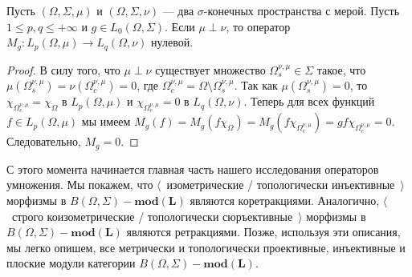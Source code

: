 \begin{proposition}\label{MultOpCharacBtwnTwoSingMeasSp} Пусть
$(\Omega,\Sigma,\mu)$ и $(\Omega,\Sigma,\nu)$ --- два $\sigma$-конечных
пространства с мерой. Пусть $1\leq p,q\leq +\infty$ и $g\in L_0(\Omega,\Sigma)$.
Если $\mu\perp\nu$, то оператор $M_g:L_p(\Omega,\mu)\to L_q(\Omega,\nu)$
нулевой.
\end{proposition}
\begin{proof} В силу того, что $\mu\perp\nu$ существует множество
$\Omega_s^{\nu,\mu}\in\Sigma$ такое, что
$\mu(\Omega_s^{\nu,\mu})=\nu(\Omega_c^{\nu,\mu})=0$, где
$\Omega_c^{\nu,\mu}=\Omega\setminus\Omega_s^{\nu,\mu}$. Так как
$\mu(\Omega_s^{\nu,\mu})=0$, то $\chi_{\Omega_c^{\nu,\mu}}=\chi_{\Omega}$ в
$L_p(\Omega,\mu)$ и $\chi_{\Omega_c^{\nu,\mu}}=0$ в $L_q(\Omega,\nu)$. Теперь
для всех функций $f\in L_p(\Omega,\mu)$ мы имеем 
$M_g(f)=M_g(f \chi_{\Omega})
=M_g(f \chi_{\Omega_c^{\nu,\mu}})
=g f\chi_{\Omega_c^{\nu,\mu}}=0$.
Следовательно, $M_g=0$.
\end{proof}

С этого момента начинается главная часть нашего исследования операторов
умножения. Мы покажем, что $\langle$~изометрические / топологически
инъективные~$\rangle$ морфизмы в $B(\Omega,\Sigma)-\mathbf{mod(L)}$ являются
коретракциями. Аналогично, $\langle$~строго коизометрические / топологически
сюръективные~$\rangle$ морфизмы в $B(\Omega,\Sigma)-\mathbf{mod(L)}$ являются
ретракциями. Позже, используя эти описания, мы легко опишем, все метрически и
топологически проективные, инъективные и плоские модули категории
$B(\Omega,\Sigma)-\mathbf{mod(L)}$.

